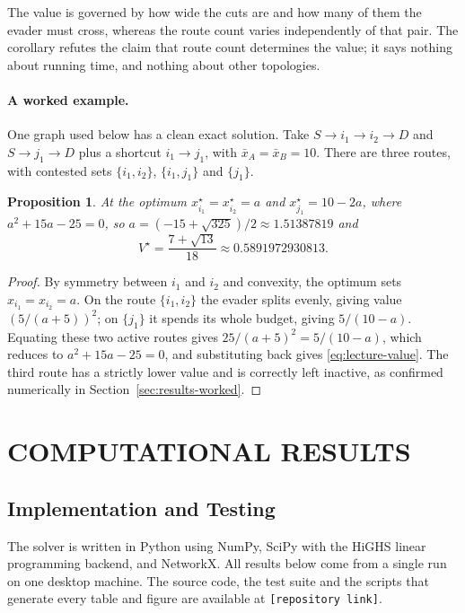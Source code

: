 \documentclass[10pt,a4paper,twoside]{article}
\theoremstyle{plain}
\newtheorem{proposition}[theorem]{Proposition}
\theoremstyle{definition}
\newcommand{\XA}{\bar{x}_A}
\newcommand{\XB}{\bar{x}_B}
\begin{document}
\noindent The value is governed by how wide the cuts are and how many of them
the evader must cross, whereas the route count varies independently of that
pair. The corollary refutes the claim that route count determines the value;
it says nothing about running time, and nothing about other topologies.

\paragraph{A worked example.}
One graph used below has a clean exact solution. Take $S\to i_1\to i_2\to D$
and $S\to j_1\to D$ plus a shortcut $i_1\to j_1$, with $\XA=\XB=10$. There
are three routes, with contested sets $\{i_1,i_2\}$, $\{i_1,j_1\}$ and
$\{j_1\}$.

\begin{proposition}
\label{prop:lecture}
At the optimum $x^{\star}_{i_1}=x^{\star}_{i_2}=a$ and
$x^{\star}_{j_1}=10-2a$, where $a^2+15a-25=0$, so
$a=(-15+\sqrt{325})/2\approx1.51387819$ and
\begin{equation}
  V^{\star}=\frac{7+\sqrt{13}}{18}\approx0.5891972930813 .
  \label{eq:lecture-value}
\end{equation}
\end{proposition}
\begin{proof}
By symmetry between $i_1$ and $i_2$ and convexity, the optimum sets
$x_{i_1}=x_{i_2}=a$. On the route $\{i_1,i_2\}$ the evader splits evenly,
giving value $(5/(a+5))^2$; on $\{j_1\}$ it spends its whole budget, giving
$5/(10-a)$. Equating these two active routes gives $25/(a+5)^2=5/(10-a)$,
which reduces to $a^2+15a-25=0$, and substituting back gives
\eqref{eq:lecture-value}. The third route has a strictly lower value and is
correctly left inactive, as confirmed numerically in
Section~\ref{sec:results-worked}.
\end{proof}

\section{COMPUTATIONAL RESULTS}
\label{sec:results}

\subsection{Implementation and Testing}

The solver is written in Python using NumPy, SciPy with the HiGHS linear
programming backend, and NetworkX. All results below come from a single run
on one desktop machine. The source code, the test suite and the scripts that
generate every table and figure are available at
\texttt{[repository link]}.
\end{document}
